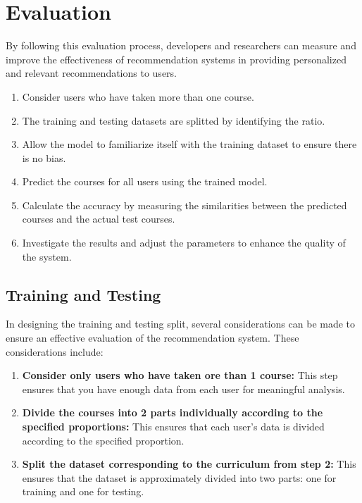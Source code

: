 \newpage

\section{Evaluation}

By following this evaluation process, developers and researchers can measure and improve the 
effectiveness of recommendation systems in providing personalized and relevant recommendations to users.

\begin{enumerate}
    \item \textsf{Consider users who have taken more than one course.}
    \item \textsf{The training and testing datasets are splitted by identifying the ratio.}
    \item \textsf{Allow the model to familiarize itself with the training dataset to ensure there is no bias.}
    \item \textsf{Predict the courses for all users using the trained model.}
    \item \textsf{Calculate the accuracy by measuring the similarities between the predicted courses and the actual test courses.}
    \item \textsf{Investigate the results and adjust the parameters to enhance the quality of the system.}
\end{enumerate}

\subsection{Training and Testing}

In designing the training and testing split, several considerations can be made to ensure an effective 
evaluation of the recommendation system. These considerations include:

\begin{enumerate}
    \item \textsf{\textbf{Consider only users who have taken ore than 1 course: }
    This step ensures that you have enough data from each user for meaningful analysis.}
    \item \textsf{\textbf{Divide the courses into 2 parts individually according to the specified proportions: }
    This ensures that each user's data is divided according to the specified proportion.}
    \item \textsf{\textbf{Split the dataset corresponding to the curriculum from step 2: }
        This ensures that the dataset is approximately divided into two parts: one for training and one for testing.}
\end{enumerate}

